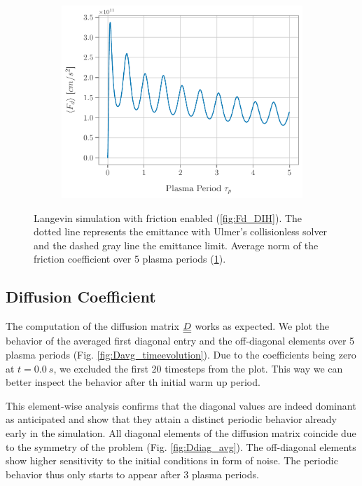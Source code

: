 \begin{figure}[h]
\begin{subfigure}[b]{0.49\textwidth}
    \includegraphics[width=1.0\textwidth, keepaspectratio, valign=b]{figures/results/Fd_avg.pdf}
    \caption{}
    \label{fig:FdAvg_timeevolution}
  \end{subfigure}
  \caption{Langevin simulation with friction enabled (\ref{fig:Fd_DIH}). The dotted line represents the
      emittance with Ulmer's collisionless solver and the dashed gray line the emittance limit. Average norm of the
  friction coefficient over 5 plasma periods (\ref{fig:FdAvg_timeevolution}).}
\label{fig:Fd_analysis_DIH}
\end{figure}

\subsection{Diffusion Coefficient}
\label{subsection:diffCoeff}

The computation of the diffusion matrix $\underline{\underline{D}}$ works as expected. We plot the behavior
of the averaged first diagonal entry and the off-diagonal elements over 5 plasma periods (Fig. \ref{fig:Davg_timeevolution}).
Due to the coefficients being zero at $t = 0.0\ s$, we excluded the first 20 timesteps from the plot. 
This way we can better inspect the behavior after th initial warm up period.

This element-wise analysis confirms that the diagonal values  are indeed dominant as anticipated and show that they
attain a distinct periodic behavior already early in the simulation.
All diagonal elements of the diffusion matrix coincide due to the symmetry of the problem
(Fig. \ref{fig:Ddiag_avg}).
The off-diagonal elements show higher sensitivity to the initial conditions in form of noise. The
periodic behavior thus only starts to appear after 3 plasma periods.

